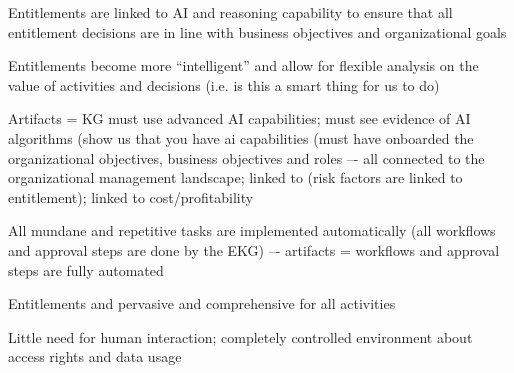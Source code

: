 \ekgmmscoringlevelFour

\begin{scoring}

  \item Entitlements are linked to AI and reasoning capability to ensure that all entitlement decisions are
        in line with business objectives and organizational goals
  \item Entitlements become more “intelligent” and allow for flexible analysis on the value of
        activities and decisions (i.e. is this a smart thing for us to do)
  \item Artifacts = KG must use advanced AI capabilities; must see evidence of AI algorithms
        (show us that you have \gls{ai} capabilities (must have onboarded the organizational objectives,
        business objectives and roles –- all connected to the organizational management landscape;
        linked to  (risk factors are linked to entitlement);
        linked to cost/profitability

\end{scoring}

\ekgmmscoringlevelFive

\begin{scoring}

  \item All mundane and repetitive tasks are implemented automatically
        (all workflows and approval steps are done by the EKG) –- artifacts = workflows and
        approval steps are fully automated
  \item Entitlements and pervasive and comprehensive for all activities
  \item Little need for human interaction; completely controlled environment about access rights and data usage

\end{scoring}
